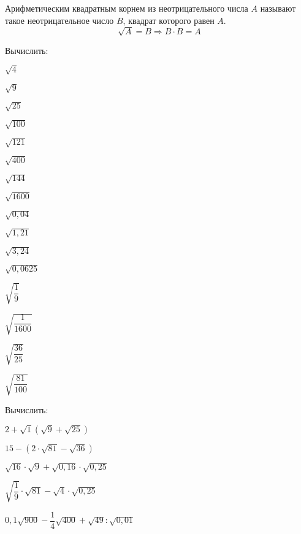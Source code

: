 %
%
%
%
\begin{class}[number=2]
	\begin{definit}
		Арифметическим квадратным корнем из неотрицательного числа \( A \) называют такое неотрицательное число \( B \), квадрат которого равен \( A \).
		\[ \sqrt{A}=B \Rightarrow B\cdot B = A \]
	\end{definit}
	\begin{listofex}
		\item Вычислить:
		\begin{enumcols}[itemcolumns=6]
			\item \( \sqrt{4} \)
			\item \( \sqrt{9} \)
			\item \( \sqrt{25} \)
			\item \( \sqrt{100} \)
			\item \( \sqrt{121} \)
			\item \( \sqrt{400} \)
			\item \( \sqrt{144} \)
			\item \( \sqrt{1600} \)
			\item \( \sqrt{0,04} \)
			\item \( \sqrt{1,21} \)
			\item \( \sqrt{3,24} \)
			\item \( \sqrt{0,0625} \)
			\item \( \sqrt{\dfrac{1}{9}} \)
			\item \( \sqrt{\dfrac{1}{1600}} \)
			\item \( \sqrt{\dfrac{36}{25}} \)
			\item \( \sqrt{\dfrac{81}{100}} \)
		\end{enumcols}
		\item Вычислить:
		\begin{enumcols}[itemcolumns=2]
			\item \( 2+\sqrt{1}(\sqrt{9}+\sqrt{25}) \)
			\item \( 15-(2\cdot\sqrt{81}-\sqrt{36}) \)
			\item \( \sqrt{16}\cdot\sqrt{9}+\sqrt{0,16}\cdot\sqrt{0,25} \)
			\item \( \sqrt{\dfrac{1}{9}}\cdot\sqrt{81}-\sqrt{4}\cdot\sqrt{0,25} \)
			\item \( 0,1\sqrt{900}-\dfrac{1}{4}\sqrt{400}+\sqrt{49}:\sqrt{0,01} \)

\end{enumcols}
\end{listofex}
\end{class}
